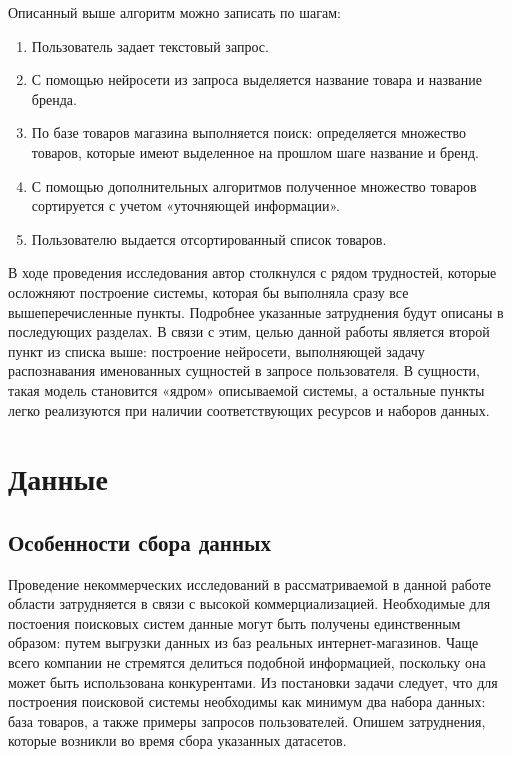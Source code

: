 \documentclass[12pt,a4paper]{article}
\begin{document}
Описанный выше алгоритм можно записать по шагам:

\begin{enumerate}
    \item Пользователь задает текстовый запрос.
    \item С помощью нейросети из запроса выделяется название товара и название бренда.
    \item По базе товаров магазина выполняется поиск: определяется множество товаров, которые имеют выделенное на прошлом шаге название и бренд.
    \item С помощью дополнительных алгоритмов полученное множество товаров сортируется с учетом «уточняющей информации».
    \item Пользователю выдается отсортированный список товаров.
\end{enumerate}

\noindent В ходе проведения исследования автор столкнулся с рядом трудностей, которые осложняют построение системы, которая бы выполняла сразу все вышеперечисленные пункты. Подробнее указанные затруднения будут описаны в последующих разделах. В связи с этим, целью данной работы является второй пункт из списка выше: построение нейросети, выполняющей задачу распознавания именованных сущностей в запросе пользователя. В сущности, такая модель становится «ядром» описываемой системы, а остальные пункты легко реализуются при наличии соответствующих ресурсов и наборов данных.

\section{Данные}
\subsection{Особенности сбора данных}

Проведение некоммерческих исследований в рассматриваемой в данной работе области затрудняется в связи с высокой коммерциализацией. Необходимые для постоения поисковых систем данные могут быть получены единственным образом: путем выгрузки данных из баз реальных интернет-магазинов. Чаще всего компании не стремятся делиться подобной информацией, поскольку она может быть использована конкурентами. Из постановки задачи следует, что для построения поисковой системы необходимы как минимум два набора данных: база товаров, а также примеры запросов пользователей. Опишем затруднения, которые возникли во время сбора указанных датасетов.
\end{document}
